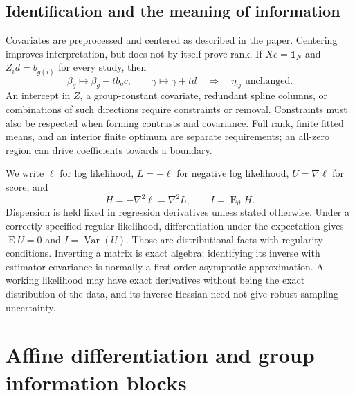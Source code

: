 \documentclass[11pt,a4paper]{article}
\newcommand{\E}{\operatorname{E}}
\newcommand{\Var}{\operatorname{Var}}
\numberwithin{equation}{section}
\begin{document}
\subsection{Identification and the meaning of information}
Covariates are preprocessed and centered as described in the paper.
Centering improves interpretation, but does not by itself prove rank.
If $Xc=\mathbf1_N$ and ${Z_i} d=b_{g(i)}$ for every study, then
\begin{equation}
 \beta_g\mapsto\beta_g-tb_gc,\qquad
 \gamma\mapsto\gamma+td
 \quad\Longrightarrow\quad \eta_{ij}\text{ unchanged}.
 \label{eq:confounding}
\end{equation}
An intercept in $Z$, a group-constant covariate, redundant spline columns,
or combinations of such directions require constraints or removal.
Constraints must also be respected when forming contrasts and covariance.
Full rank, finite fitted means, and an interior finite optimum are separate
requirements; an all-zero region can drive coefficients towards a boundary.

We write $\ell$ for log likelihood, $L=-\ell$ for negative log likelihood,
$U=\nabla\ell$ for score, and
\begin{equation}
 H=-\nabla^2\ell=\nabla^2L,\qquad I=\E_\vartheta H.
 \label{eq:information}
\end{equation}
Dispersion is held fixed in regression derivatives unless stated otherwise.
Under a correctly specified regular likelihood, differentiation under
the expectation gives $\E U=0$ and $I=\Var(U)$.
Those are distributional facts with regularity conditions.
Inverting a matrix is exact algebra; identifying its inverse with estimator
covariance is normally a first-order asymptotic approximation.
A working likelihood may have exact derivatives without being the exact
distribution of the data, and its inverse Hessian need not give robust
sampling uncertainty.

\section{Affine differentiation and group information blocks}\label{sec:chain}
\end{document}
